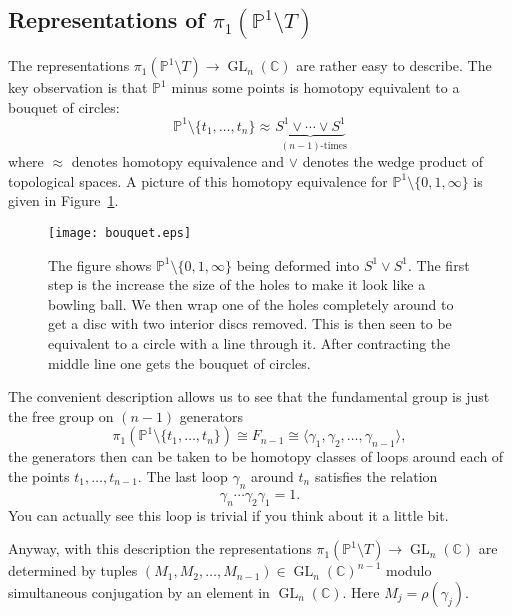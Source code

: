 \documentclass[12pt]{book}
\numberwithin{equation}{section}
\theoremstyle{definition}
\theoremstyle{remark}
\newcommand{\CC}{\mathbb{C}}
\newcommand{\PP}{\mathbb{P}}
\newcommand{\GL}{\operatorname{GL}}
\begin{document}
\subsection{Representations of $\pi_1(\PP^1\setminus T)$}
The representations $\pi_1(\PP^1\setminus T) \to \GL_n(\CC)$ are rather easy to describe. 
The key observation is that $\PP^1$ minus some points is homotopy equivalent to a bouquet of circles:
$$ \PP^1 \setminus \lbrace t_1,\ldots,t_n\rbrace \approx \underbrace{S^1 \vee \cdots \vee S^1}_{ \mbox{ $(n-1)$-times}}$$
where $\approx$ denotes homotopy equivalence and $\vee$ denotes the wedge product of topological spaces. 
A picture of this homotopy equivalence for $\PP^1 \setminus \lbrace 0,1,\infty\rbrace$ is given in Figure~\ref{F:bouquet}.
\begin{figure}[h]\label{F:bouquet}
	\begin{center}
		\texttt{[image: bouquet.eps]}
	\end{center}
	\caption{The figure shows $\PP^1\setminus \lbrace 0, 1, \infty\rbrace$ being deformed into $S^1 \vee S^1$. 
		The first step is the increase the size of the holes to make it look like a bowling ball. 
		We then wrap one of the holes completely around to get a disc with two interior discs removed. 
		This is then seen to be equivalent to a circle with a line through it. 
		After contracting the middle line one gets the bouquet of circles. 
	}
\end{figure}
The convenient description allows us to see that the fundamental group is just the free group on $(n-1)$ generators
$$\pi_1(\PP^1\setminus\lbrace t_1,\ldots,t_n\rbrace) \cong F_{n-1} \cong \langle \gamma_1,\gamma_2,\ldots,\gamma_{n-1} \rangle,$$ 
the generators then can be taken to be homotopy classes of loops around each of the points $t_1,\ldots, t_{n-1}$. 
The last loop $\gamma_n$ around $t_n$ satisfies the relation 
$$ \gamma_n \cdots \gamma_2 \gamma_1  = 1.$$
You can actually see this loop is trivial if you think about it a little bit. 

Anyway, with this description the representations $\pi_1(\PP^1\setminus T) \to \GL_n(\CC)$ are determined by tuples $(M_1,M_2,\ldots,M_{n-1}) \in \GL_n(\CC)^{n-1}$ modulo simultaneous conjugation by an element in $\GL_n(\CC)$.
Here $M_j = \rho(\gamma_j)$. 

\end{document}
